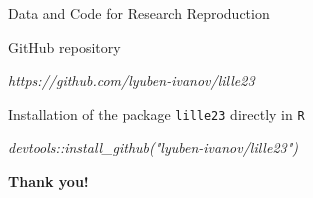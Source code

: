 %
%
%
%	


\begin{frame}{Data and Code for Research Reproduction }


GitHub repository

\quad \quad \textit{https://github.com/lyuben-ivanov/lille23}

Installation of the package \texttt{lille23} directly in \texttt{R}

\quad \quad \textit{devtools::install\_github("lyuben-ivanov/lille23")}

\end{frame}




\begin{frame}
\centering \Huge \bfseries Thank you!	
\end{frame}













